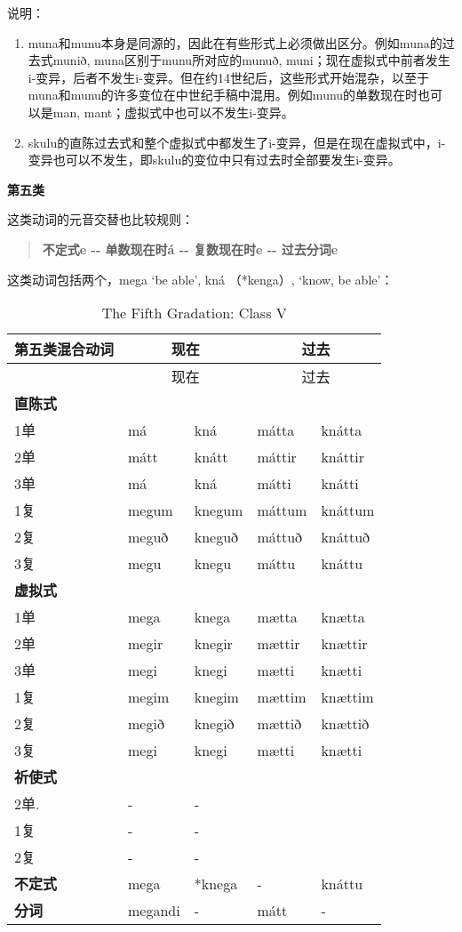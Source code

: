 说明：

\begin{enumerate}
\def\labelenumi{\arabic{enumi})}
\item
  muna和munu本身是同源的，因此在有些形式上必须做出区分。例如muna的过去式munið,
  muna区别于munu所对应的munuð,
  muni；现在虚拟式中前者发生i-变异，后者不发生i-变异。但在约14世纪后，这些形式开始混杂，以至于muna和munu的许多变位在中世纪手稿中混用。例如munu的单数现在时也可以是man,
  mant；虚拟式中也可以不发生i-变异。
\item
  skulu的直陈过去式和整个虚拟式中都发生了i-变异，但是在现在虚拟式中，i-变异也可以不发生，即skulu的变位中只有过去时全部要发生i-变异。
\end{enumerate}

\textbf{第五类}

这类动词的元音交替也比较规则：

\begin{quote}
\textbf{不定式e -\/- 单数现在时á -\/- 复数现在时e -\/- 过去分词e}
\end{quote}

这类动词包括两个，mega `be able‌', kná （*kenga）, `know, be able‌'：

\begin{longtable}{lllll}
\caption[The Fifth Gradation: Class V]{The Fifth Gradation: Class
V}\tabularnewline
\toprule
第五类混合动词 &\multicolumn{2}{c}{现在} &\multicolumn{2}{c}{过去} \\\midrule\endfirsthead{} &\multicolumn{2}{c}{现在} &\multicolumn{2}{c}{过去} \\
\midrule
\endhead
\bottomrule
\endfoot
\textbf{直陈式} & ~ & ~ & ~ & ~ \\
1单 & má & kná & mátta & knátta \\
2单 & mátt & knátt & máttir & knáttir \\
3单 & má & kná & mátti & knátti \\
1复 & megum & knegum & máttum & knáttum \\
2复 & meguð & kneguð & máttuð & knáttuð \\
3复 & megu & knegu & máttu & knáttu \\
\textbf{虚拟式} & ~ & ~ & ~ & ~ \\
1单 & mega & knega & mætta & knætta \\
2单 & megir & knegir & mættir & knættir \\
3单 & megi & knegi & mætti & knætti \\
1复 & megim & knegim & mættim & knættim \\
2复 & megið & knegið & mættið & knættið \\
3复 & megi & knegi & mætti & knætti \\
\textbf{祈使式} & ~ & ~ & ~ & ~ \\
2单. & - & - & ~ & ~ \\
1复 & - & - & ~ & ~ \\
2复 & - & - & ~ & ~ \\
\textbf{不定式} & mega & *knega & - & knáttu \\
\textbf{分词} & megandi & - & mátt & - \\
\end{longtable}


